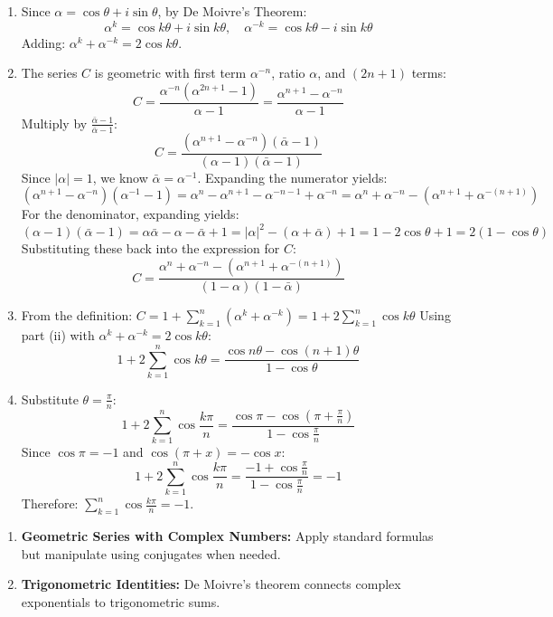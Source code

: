 \begin{solution}
\begin{enumerate}[label=(\roman*)]
    \item Since $\alpha = \cos\theta + i \sin\theta$, by De Moivre's Theorem:
    $$\alpha^k = \cos k\theta + i \sin k\theta, \quad \alpha^{-k} = \cos k\theta - i \sin k\theta$$
    Adding: $\alpha^k + \alpha^{-k} = 2 \cos k\theta$.

    \item The series $C$ is geometric with first term $\alpha^{-n}$, ratio $\alpha$, and $(2n+1)$ terms:
    $$C = \frac{\alpha^{-n}(\alpha^{2n+1} - 1)}{\alpha - 1} = \frac{\alpha^{n+1} - \alpha^{-n}}{\alpha - 1}$$
    Multiply by $\frac{\bar{\alpha} - 1}{\bar{\alpha} - 1}$:
    $$C = \frac{(\alpha^{n+1} - \alpha^{-n})(\bar{\alpha} - 1)}{(\alpha - 1)(\bar{\alpha} - 1)}$$
    Since $|\alpha|=1$, we know $\bar{\alpha} = \alpha^{-1}$. Expanding the numerator yields:
    $$(\alpha^{n+1} - \alpha^{-n})(\alpha^{-1} - 1) = \alpha^n - \alpha^{n+1} - \alpha^{-n-1} + \alpha^{-n} = \alpha^n + \alpha^{-n} - (\alpha^{n+1} + \alpha^{-(n+1)})$$
    For the denominator, expanding yields:
    $$(\alpha - 1)(\bar{\alpha} - 1) = \alpha\bar{\alpha} - \alpha - \bar{\alpha} + 1 = |\alpha|^2 - (\alpha + \bar{\alpha}) + 1 = 1 - 2\cos\theta + 1 = 2(1-\cos\theta)$$
    Substituting these back into the expression for $C$:
    $$C = \frac{\alpha^n + \alpha^{-n} - (\alpha^{n+1} + \alpha^{-(n+1)})}{(1-\alpha)(1-\bar{\alpha})}$$

    \item From the definition: $C = 1 + \sum_{k=1}^n (\alpha^k + \alpha^{-k}) = 1 + 2\sum_{k=1}^n \cos k\theta$
    Using part (ii) with $\alpha^k + \alpha^{-k} = 2\cos k\theta$:
    $$1 + 2\sum_{k=1}^n \cos k\theta = \frac{\cos n\theta - \cos (n+1)\theta}{1 - \cos\theta}$$

    \item Substitute $\theta = \frac{\pi}{n}$:
    $$1 + 2\sum_{k=1}^n \cos \frac{k\pi}{n} = \frac{\cos \pi - \cos \left(\pi + \frac{\pi}{n}\right)}{1 - \cos \frac{\pi}{n}}$$
    Since $\cos\pi = -1$ and $\cos(\pi + x) = -\cos x$:
    $$1 + 2\sum_{k=1}^n \cos \frac{k\pi}{n} = \frac{-1 + \cos \frac{\pi}{n}}{1 - \cos \frac{\pi}{n}} = -1$$
    Therefore: $\sum_{k=1}^n \cos \frac{k\pi}{n} = -1$.
\end{enumerate}
\end{solution}

\begin{takeaways}
\begin{enumerate}
    \item \textbf{Geometric Series with Complex Numbers:} Apply standard formulas but manipulate using conjugates when needed.
    \item \textbf{Trigonometric Identities:} De Moivre's theorem connects complex exponentials to trigonometric sums.
\end{enumerate}
\end{takeaways}

